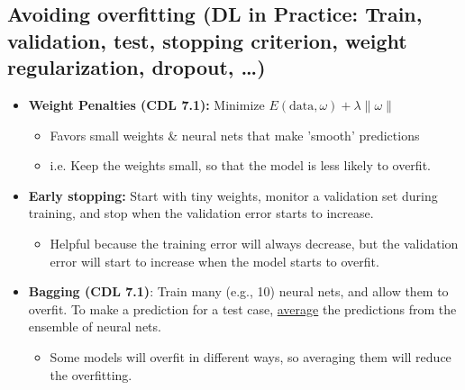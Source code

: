 \subsection{Avoiding overfitting (DL in Practice: Train, validation, test, stopping criterion, weight regularization, dropout, \dots)}
\begin{summary}
    \begin{itemize}
        \item \textbf{Weight Penalties (CDL 7.1):} Minimize \( E(\text{data}, \omega) + \lambda \|\omega\| \)
        \begin{itemize}
            \item Favors small weights \& neural nets that make 'smooth' predictions
            \item i.e. Keep the weights small, so that the model is less likely to overfit.
        \end{itemize}
        \item \textbf{Early stopping:} Start with tiny weights, monitor a validation set during training, and stop when the validation error starts to increase.
        \begin{itemize}
            \item Helpful because the training error will always decrease, but the validation error will start to increase when the model starts to overfit.
        \end{itemize}
        \item \textbf{Bagging (CDL 7.1)}: Train many (e.g., 10) neural nets, and allow them to overfit. To make a prediction for a test case, \underline{average} the predictions from the ensemble of neural nets.
        \begin{itemize}
            \item Some models will overfit in different ways, so averaging them will reduce the overfitting.
        \end{itemize}
    \end{itemize}
\end{summary}


